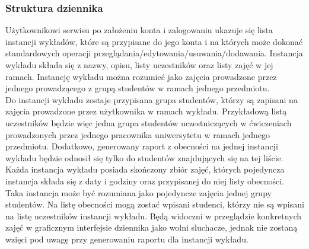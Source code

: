 \documentclass[declaration,shortabstract, mgr]{iithesis}
\begin{document}
\subsubsection{Struktura dziennika}
\indent Użytkownikowi serwisu po założeniu konta i zalogowaniu ukazuje się lista instancji wykładów, które są przypisane do jego konta i na których może dokonać standardowych operacji przeglądania/edytowania/usuwania/dodawania. Instancja wykładu składa się z nazwy, opisu, listy uczestników oraz listy zajęć w jej ramach. Instancję wykładu można  rozumieć jako zajęcia prowadzone przez jednego prowadzącego z grupą studentów w ramach jednego przedmiotu. \\
\indent Do instancji wykładu zostaje przypisana grupa studentów, którzy są zapisani na zajęcia prowadzone przez użytkownika w ramach wykładu. Przykładową listą uczestników będzie więc jedna grupa studentów uczestniczących w ćwiczeniach prowadzonych przez jednego pracownika uniwersytetu w ramach jednego przedmiotu. Dodatkowo, generowany raport z obecności na jednej instancji wykładu będzie odnosił się tylko do studentów znajdujących się na tej liście.\\
\indent Każda instancja wykładu posiada skończony zbiór zajęć, których pojedyncza instancja składa się z daty i godziny oraz przypisanej do niej listy obecności. Taka instancja może być rozumiana jako pojedyncze zajęcia jednej grupy studentów. Na listę obecności mogą zostać wpisani studenci, którzy nie są wpisani na listę uczestników instancji wykładu. Będą widoczni w przeglądzie konkretnych zajęć w graficznym interfejsie dziennika jako wolni sluchacze, jednak nie zostaną wzięci pod uwagę przy generowaniu raportu dla instancji wykładu.\\
\end{document}
